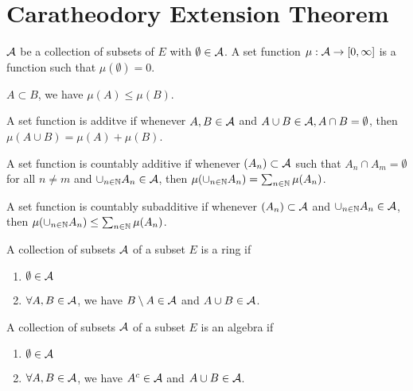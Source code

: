 \section{Caratheodory Extension Theorem}


\begin{definition}
    $\mathcal{A}$ be a collection of subsets of $E$ with $\emptyset\in\mathcal{A}$.
    A set function $\mu:\mathcal{A}\to [0,\infty]$ is a function such that $\mu(\emptyset)=0$.
\end{definition}

\begin{definition}
    $A\subset B$, we have $\mu(A)\leq \mu(B)$.
\end{definition}

\begin{definition}
    A set function is additve if whenever $A,B\in\mathcal{A}$ and $A\cup B\in\mathcal{A},A\cap B=\emptyset$, then $\mu(A\cup B)=\mu(A)+\mu(B)$.
\end{definition}

\begin{definition}
    A set function is countably additive if whenever $(A_n)\subset\mathcal{A}$ such that $A_n\cap A_m=\emptyset$ for all $n\neq m$ and $\cup_{n\in\mathbb{N}}A_n\in\mathcal{A}$, then $\mu(\cup_{n\in\mathbb{N}}A_n)=\sum_{n\in\mathbb{N}}\mu(A_n)$.
\end{definition}

\begin{definition}
    A set function is countably subadditive if whenever $(A_n)\subset\mathcal{A}$ and $\cup_{n\in\mathbb{N}}A_n\in\mathcal{A}$, then $\mu(\cup_{n\in\mathbb{N}}A_n)\leq\sum_{n\in\mathbb{N}}\mu(A_n)$.
\end{definition}

\begin{definition}[ring]
    A collection of subsets $\mathcal{A}$ of a subset $E$ is a ring if 
    \begin{enumerate}
        \item $\emptyset\in \mathcal{A}$ 
        \item $\forall A,B\in\mathcal{A}$, we have $B\setminus A\in\mathcal{A}$ and $A\cup B\in\mathcal{A}$.
    \end{enumerate}
\end{definition}

\begin{definition}[algebra]
    A collection of subsets $\mathcal{A}$ of a subset $E$ is an algebra if 
    \begin{enumerate}
        \item $\emptyset\in \mathcal{A}$ 
        \item $\forall A,B\in\mathcal{A}$, we have $A^c \in\mathcal{A}$ and $A\cup B\in\mathcal{A}$.
    \end{enumerate}
\end{definition}

